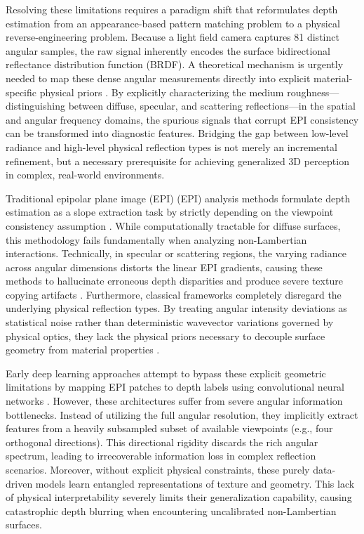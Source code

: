 \documentclass[lettersize,journal]{IEEEtran}
\begin{document}
Resolving these limitations requires a paradigm shift that reformulates depth estimation from an appearance-based pattern matching problem to a physical reverse-engineering problem. Because a light field camera captures 81 distinct angular samples, the raw signal inherently encodes the surface bidirectional reflectance distribution function (BRDF). A theoretical mechanism is urgently needed to map these dense angular measurements directly into explicit material-specific physical priors \cite{wang2023}. By explicitly characterizing the medium roughness—distinguishing between diffuse, specular, and scattering reflections—in the spatial and angular frequency domains, the spurious signals that corrupt EPI consistency can be transformed into diagnostic features. Bridging the gap between low-level radiance and high-level physical reflection types is not merely an incremental refinement, but a necessary prerequisite for achieving generalized 3D perception in complex, real-world environments.

Traditional epipolar plane image (EPI) (EPI) analysis methods formulate depth estimation as a slope extraction task by strictly depending on the viewpoint consistency assumption \cite{wanner2014, wang2015}. While computationally tractable for diffuse surfaces, this methodology fails fundamentally when analyzing non-Lambertian interactions. Technically, in specular or scattering regions, the varying radiance across angular dimensions distorts the linear EPI gradients, causing these methods to hallucinate erroneous depth disparities and produce severe texture copying artifacts \cite{tao2013}. Furthermore, classical frameworks completely disregard the underlying physical reflection types. By treating angular intensity deviations as statistical noise rather than deterministic wavevector variations governed by physical optics, they lack the physical priors necessary to decouple surface geometry from material properties \cite{honauer2016}.

Early deep learning approaches attempt to bypass these explicit geometric limitations by mapping EPI patches to depth labels using convolutional neural networks \cite{heber2018, lyu2022}. However, these architectures suffer from severe angular information bottlenecks. Instead of utilizing the full angular resolution, they implicitly extract features from a heavily subsampled subset of available viewpoints (e.g., four orthogonal directions). This directional rigidity discards the rich angular spectrum, leading to irrecoverable information loss in complex reflection scenarios. Moreover, without explicit physical constraints, these purely data-driven models learn entangled representations of texture and geometry. This lack of physical interpretability severely limits their generalization capability, causing catastrophic depth blurring when encountering uncalibrated non-Lambertian surfaces.
\end{document}
